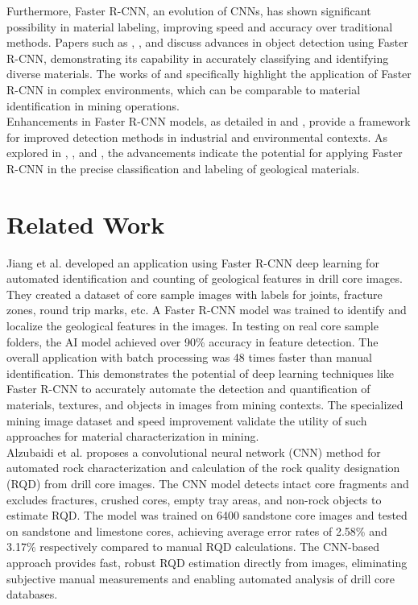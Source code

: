\documentclass[sigconf,authordraft]{acmart}
\begin{document}
Furthermore, Faster R-CNN, an evolution of CNNs, has shown significant possibility in material labeling, improving speed and accuracy over traditional methods. Papers such as \cite{10}, \cite{11}, and \cite{12} discuss advances in object detection using Faster R-CNN, demonstrating its capability in accurately classifying and identifying diverse materials. The works of \cite{13} and \cite{14} specifically highlight the application of Faster R-CNN in complex environments, which can be comparable to material identification in mining operations. \\

Enhancements in Faster R-CNN models, as detailed in \cite{15} and \cite{16}, provide a framework for improved detection methods in industrial and environmental contexts. As explored in \cite{17}, \cite{18}, and \cite{1}, the advancements indicate the potential for applying Faster R-CNN in the precise classification and labeling of geological materials. \\

\section{Related Work}
Jiang et al.\cite{31} developed an application using Faster R-CNN deep learning for automated identification and counting of geological features in drill core images. They created a dataset of core sample images with labels for joints, fracture zones, round trip marks, etc. A Faster R-CNN model was trained to identify and localize the geological features in the images. In testing on real core sample folders, the AI model achieved over 90\% accuracy in feature detection. The overall application with batch processing was 48 times faster than manual identification. This demonstrates the potential of deep learning techniques like Faster R-CNN to accurately automate the detection and quantification of materials, textures, and objects in images from mining contexts. The specialized mining image dataset and speed improvement validate the utility of such approaches for material characterization in mining. \\

Alzubaidi et al.\cite{1} proposes a convolutional neural network (CNN) method for automated rock characterization and calculation of the rock quality designation (RQD) from drill core images. The CNN model detects intact core fragments and excludes fractures, crushed cores, empty tray areas, and non-rock objects to estimate RQD. The model was trained on 6400 sandstone core images and tested on sandstone and limestone cores, achieving average error rates of 2.58\% and 3.17\% respectively compared to manual RQD calculations. The CNN-based approach provides fast, robust RQD estimation directly from images, eliminating subjective manual measurements and enabling automated analysis of drill core databases. \\
\end{document}
